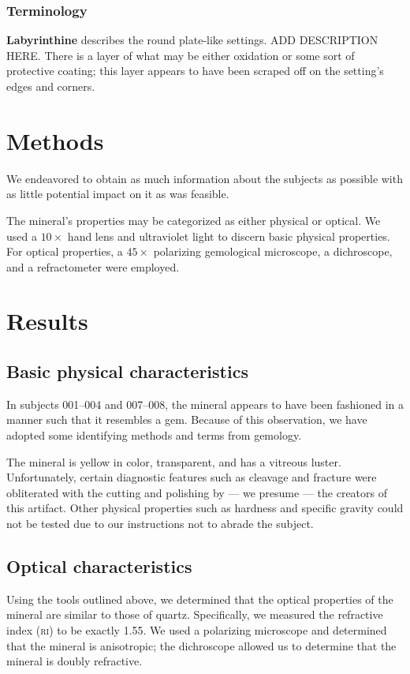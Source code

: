 \documentclass[10pt]{article}
\begin{document}
\subsubsection{Terminology}

\textbf{Labyrinthine} describes the round plate-like settings. ADD DESCRIPTION HERE.
There is a layer of what may be either oxidation or some sort of protective coating; this layer appears to have been scraped off on the setting's edges and corners.

\section{Methods}
We endeavored to obtain as much information about the subjects as possible with as little potential impact on it as was feasible.

The mineral's properties may be categorized as either physical or optical.
We used a $10\times$ hand lens and ultraviolet light to discern basic physical properties.
For optical properties, a $45\times$ polarizing gemological microscope, a dichroscope, and a refractometer were employed.

\section{Results}

\subsection{Basic physical characteristics}
In subjects 001--004 and 007--008, the mineral appears to have been fashioned in a manner such that it resembles a gem.
Because of this observation, we have adopted some identifying methods and terms from gemology.

The mineral is yellow in color, transparent, and has a vitreous luster.
Unfortunately, certain diagnostic features such as cleavage and fracture were obliterated with the cutting and polishing by --- we presume --- the creators of this artifact.
Other physical properties such as hardness and specific gravity could not be tested due to our instructions not to abrade the subject.

\subsection{Optical characteristics}
Using the tools outlined above, we determined that the optical properties of the mineral are similar to those of quartz.
Specifically, we measured the refractive index (\textsc{ri}) to be exactly 1.55.
We used a polarizing microscope and determined that the mineral is anisotropic; the dichroscope allowed us to determine that the mineral is doubly refractive.
\end{document}
